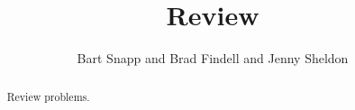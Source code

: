 \documentclass[nooutcomes]{ximera}
\title{Review}
\author{Bart Snapp and Brad Findell and Jenny Sheldon}
\begin{document}
\begin{abstract}
Review problems.
\end{abstract}
\maketitle


\end{document}
